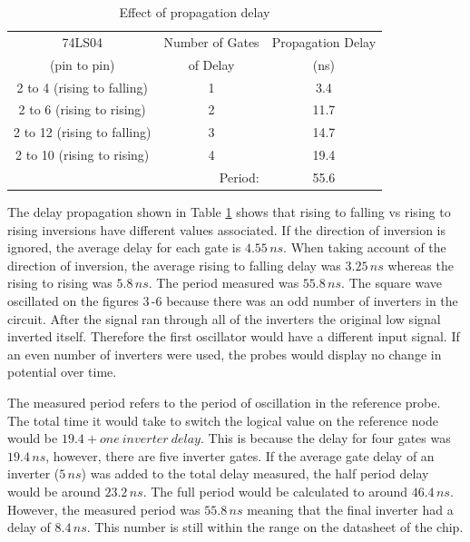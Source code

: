 \documentclass[CMPE]{KGCOEReport}
\begin{document}
\begin{table}[h]
\renewcommand{\arraystretch}{1.2}
\caption{Effect of propagation delay}
\begin{center}
\begin{tabular}{|c|c|c|}
\hline

74LS04 & Number of Gates & Propagation Delay \\
(pin to pin) & of Delay & (ns)\\\hline

2 to 4 (rising to falling) & 1 & 3.4\\\hline
2 to 6 (rising to rising) & 2 & 11.7\\\hline
2 to 12 (rising to falling) & 3 & 14.7\\\hline
2 to 10 (rising to rising) & 4 & 19.4\\\hline
\multicolumn{2}{|r|}{Period: } & 55.6  \\\hline

\end{tabular}
\end{center}
\label{tab:INV}
\end{table}

The delay propagation shown in Table \ref{tab:INV} shows that rising to falling vs rising to rising inversions have different values associated. If the direction of inversion is ignored, the average delay for each gate is $4.55\,ns$. When taking account of the direction of inversion, the average rising to falling delay was $3.25\,ns$ whereas the rising to rising was $5.8\,ns$. The period measured was $55.8\,ns$. The square wave oscillated on the figures 3\,-6 because there was an odd number of inverters in the circuit. After the signal ran through all of the inverters the original low signal inverted itself. Therefore the first oscillator would have a different input signal. If an even number of inverters were used, the probes would display no change in potential over time.

The measured period refers to the period of oscillation in the reference probe. The total time it would take to switch the logical value on the reference node would be $19.4 + one\ inverter\ delay$. This is because the delay for four gates was $19.4\,ns$, however, there are five inverter gates. If the average gate delay of an inverter ($5\,ns$) was added to the total delay measured, the half period delay would be around $23.2\,ns$. The full period would be calculated to around $46.4\,ns$. However, the measured period was $55.8\,ns$ meaning that the final inverter had a delay of $8.4\,ns$. This number is still within the range on the datasheet of the chip.
\end{document}
